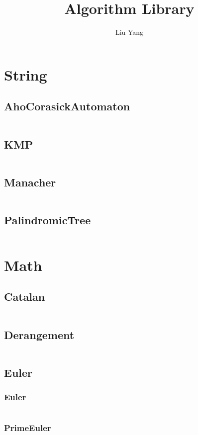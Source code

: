 \documentclass[a4paper,11pt]{article}
\author{Liu Yang}
\title{Algorithm Library}
\begin{document}
 
\maketitle
\newpage
\tableofcontents
\newpage

\section{String}
\subsection{AhoCorasickAutomaton}
\inputminted[breaklines]{c++}{01++String/+AhoCorasickAutomaton.cpp}
\subsection{KMP}
\inputminted[breaklines]{c++}{01++String/+KMP.cpp}
\subsection{Manacher}
\inputminted[breaklines]{c++}{01++String/+Manacher.cpp}
\subsection{PalindromicTree}
\inputminted[breaklines]{c++}{01++String/+PalindromicTree.cpp}

\newpage
\section{Math}
\subsection{Catalan}
\inputminted[breaklines]{c++}{02++Math/+Catalan.cpp}
\subsection{Derangement}
\inputminted[breaklines]{c++}{02++Math/+Derangement.cpp}
\subsection{Euler}
\subsubsection{Euler}
\inputminted[breaklines]{c++}{02++Math/+Euler/+Euler.cpp}
\subsubsection{PrimeEuler}
\inputminted[breaklines]{c++}{02++Math/+Euler/+PrimeEuler.cpp}
\end{document}
